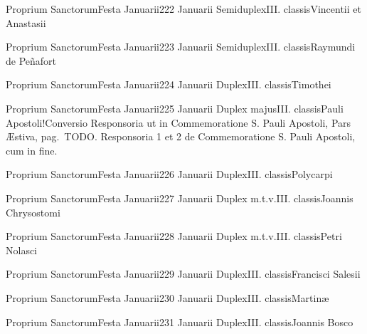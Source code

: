 \documentclass[liber-responsorialis_hiemalis.tex]{subfiles}
\begin{document}
	{Proprium Sanctorum}{Festa Januarii}{2}{22 Januarii}
	{Semiduplex}{III. classis}{Vincentii et Anastasii}
	{\pmexrubric}
	{\respdetemp}

	{Proprium Sanctorum}{Festa Januarii}{2}{23 Januarii}
	{Semiduplex}{III. classis}{Raymundi de Peñafort}
	{\conprubric}
	{\respdetemp}

	{Proprium Sanctorum}{Festa Januarii}{2}{24 Januarii}
	{Duplex}{III. classis}{Timothei}
	{\umexrubric}
	{\respdetemp}

	{Proprium Sanctorum}{Festa Januarii}{2}{25 Januarii}
	{Duplex majus}{III. classis}{Pauli Apostoli!Conversio}
	{Responsoria ut in Commemoratione S. Pauli Apostoli, Pars Æstiva, pag.\ TODO.}
	{Responsoria 1 et 2 de Commemoratione S. Pauli Apostoli, cum  in fine.}

	{Proprium Sanctorum}{Festa Januarii}{2}{26 Januarii}
	{Duplex}{III. classis}{Polycarpi}
	{\umexrubric}
	{\respdetemp}

	{Proprium Sanctorum}{Festa Januarii}{2}{27 Januarii}
	{Duplex m.t.v.}{III. classis}{Joannis Chrysostomi}
	{\copodorubric}
	{\respdetemp}

	{Proprium Sanctorum}{Festa Januarii}{2}{28 Januarii}
	{Duplex m.t.v.}{III. classis}{Petri Nolasci}
	{\conprubric}
	{\respdetemp}

	{Proprium Sanctorum}{Festa Januarii}{2}{29 Januarii}
	{Duplex}{III. classis}{Francisci Salesii}
	{\copodorubric}
	{\respdetemp}

	{Proprium Sanctorum}{Festa Januarii}{2}{30 Januarii}
	{Duplex}{III. classis}{Martinæ}
	{\vmrubric}
	{\respdetemp}

	{Proprium Sanctorum}{Festa Januarii}{2}{31 Januarii}
	{Duplex}{III. classis}{Joannis Bosco}
	{\conprubric}
	{\respdetemp}
\end{document}
